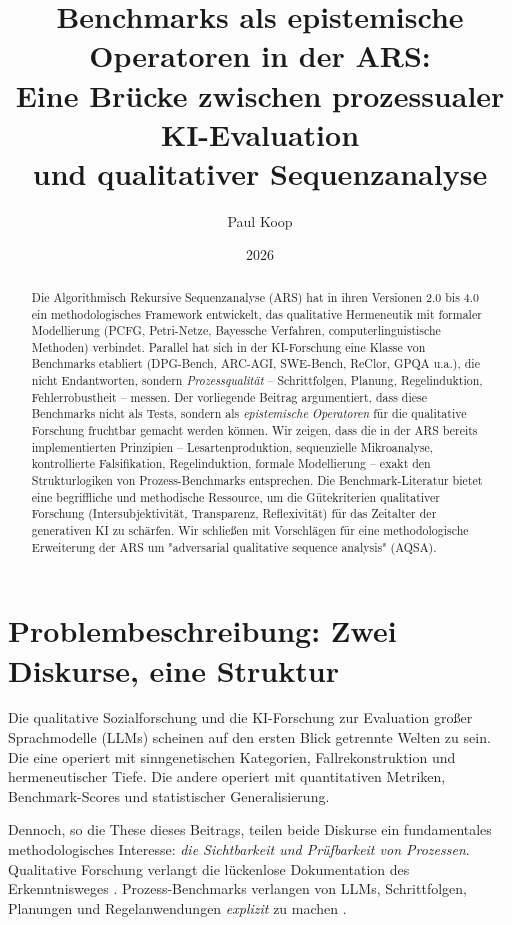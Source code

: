 \documentclass[12pt,a4paper]{article}
\title{Benchmarks als epistemische Operatoren in der ARS:\\
Eine Brücke zwischen prozessualer KI-Evaluation\\
und qualitativer Sequenzanalyse}
\author{
  \large
  \begin{tabular}{c}
    Paul Koop
  \end{tabular}
}
\date{\large 2026}
\begin{document}
\maketitle

\begin{abstract}
Die Algorithmisch Rekursive Sequenzanalyse (ARS) hat in ihren Versionen 2.0 bis 4.0 ein methodologisches Framework entwickelt, das qualitative Hermeneutik mit formaler Modellierung (PCFG, Petri-Netze, Bayessche Verfahren, computerlinguistische Methoden) verbindet. Parallel hat sich in der KI-Forschung eine Klasse von Benchmarks etabliert (DPG-Bench, ARC-AGI, SWE-Bench, ReClor, GPQA u.a.), die nicht Endantworten, sondern \textit{Prozessqualität} – Schrittfolgen, Planung, Regelinduktion, Fehlerrobustheit – messen. Der vorliegende Beitrag argumentiert, dass diese Benchmarks nicht als Tests, sondern als \textit{epistemische Operatoren} für die qualitative Forschung fruchtbar gemacht werden können. Wir zeigen, dass die in der ARS bereits implementierten Prinzipien – Lesartenproduktion, sequenzielle Mikroanalyse, kontrollierte Falsifikation, Regelinduktion, formale Modellierung – exakt den Strukturlogiken von Prozess-Benchmarks entsprechen. Die Benchmark-Literatur bietet eine begriffliche und methodische Ressource, um die Gütekriterien qualitativer Forschung (Intersubjektivität, Transparenz, Reflexivität) für das Zeitalter der generativen KI zu schärfen. Wir schließen mit Vorschlägen für eine methodologische Erweiterung der ARS um "adversarial qualitative sequence analysis" (AQSA).
\end{abstract}

\section{Problembeschreibung: Zwei Diskurse, eine Struktur}

Die qualitative Sozialforschung und die KI-Forschung zur Evaluation großer Sprachmodelle (LLMs) scheinen auf den ersten Blick getrennte Welten zu sein. Die eine operiert mit sinngenetischen Kategorien, Fallrekonstruktion und hermeneutischer Tiefe. Die andere operiert mit quantitativen Metriken, Benchmark-Scores und statistischer Generalisierung.

Dennoch, so die These dieses Beitrags, teilen beide Diskurse ein fundamentales methodologisches Interesse: \textit{die Sichtbarkeit und Prüfbarkeit von Prozessen}. Qualitative Forschung verlangt die lückenlose Dokumentation des Erkenntnisweges \cite{steinke2004gütekriterien}. Prozess-Benchmarks verlangen von LLMs, Schrittfolgen, Planungen und Regelanwendungen \textit{explizit} zu machen \cite{chollet2019measure, zhong2024dpg}.
\end{document}
